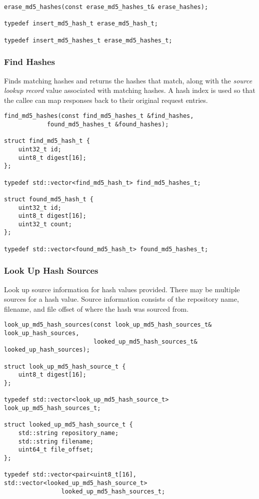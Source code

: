 \documentclass[12pt,twoside]{article}
\begin{document}
\begin{small}
\begin{verbatim}
erase_md5_hashes(const erase_md5_hashes_t& erase_hashes);

typedef insert_md5_hash_t erase_md5_hash_t;

typedef insert_md5_hashes_t erase_md5_hashes_t;
\end{verbatim}
\end{small}

\subsubsection{Find Hashes}
Finds matching hashes and returns the hashes that match,
along with the \emph{source lookup record} value
associated with matching hashes.
A hash index is used so that the callee can map responses back
to their original request entries.

\begin{small}
\begin{verbatim}
find_md5_hashes(const find_md5_hashes_t &find_hashes,
            found_md5_hashes_t &found_hashes);

struct find_md5_hash_t {
    uint32_t id;
    uint8_t digest[16];
};

typedef std::vector<find_md5_hash_t> find_md5_hashes_t;

struct found_md5_hash_t {
    uint32_t id;
    uint8_t digest[16];
    uint32_t count;
};

typedef std::vector<found_md5_hash_t> found_md5_hashes_t;
\end{verbatim}
\end{small}

\subsubsection{Look Up Hash Sources}
Look up source information for hash values provided.
There may be multiple sources for a hash value.
Source information consists of the repository name, filename, and file offset
of where the hash was sourced from.

\begin{small}
\begin{verbatim}
look_up_md5_hash_sources(const look_up_md5_hash_sources_t& look_up_hash_sources,
                         looked_up_md5_hash_sources_t& looked_up_hash_sources);

struct look_up_md5_hash_source_t {
    uint8_t digest[16];
};

typedef std::vector<look_up_md5_hash_source_t> look_up_md5_hash_sources_t;

struct looked_up_md5_hash_source_t {
    std::string repository_name;
    std::string filename;
    uint64_t file_offset;
};

typedef std::vector<pair<uint8_t[16], std::vector<looked_up_md5_hash_source_t>
                looked_up_md5_hash_sources_t;
\end{verbatim}
\end{small}
\end{document}
